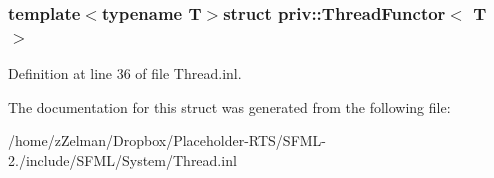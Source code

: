 \subsubsection*{template$<$typename T$>$struct priv\-::\-Thread\-Functor$<$ T $>$}



Definition at line 36 of file Thread.\-inl.



The documentation for this struct was generated from the following file\-:\begin{DoxyCompactItemize}
\item 
/home/z\-Zelman/\-Dropbox/\-Placeholder-\/\-R\-T\-S/\-S\-F\-M\-L-\/2./include/\-S\-F\-M\-L/\-System/Thread.\-inl\end{DoxyCompactItemize}
